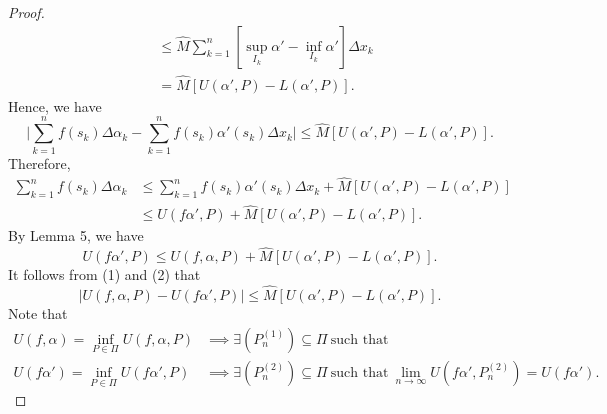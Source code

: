 \begin{proof}
\begin{align*}
    &\leq \hat{M} \sum_{ k=1  }^{ n } [\sup_{{I}_{k}} \alpha' - \inf_{{I}_{k}} \alpha'] \Delta {x}_{k} \tag{lemma 1} \\
    &= \hat{M} [U(\alpha',P) - L(\alpha',P)].
\end{align*}
Hence, we have
\[ \Big| \sum_{ k=1  }^{ n } f({s}_{k}) \Delta {\alpha}_{k } - \sum_{ k=1  }^{ n } f({s}_{k}) \alpha'({s}_{k}) \Delta {x}_{k} \Big| \leq \hat{M} [U(\alpha',P) - L(\alpha', P)]. \]
Therefore, 
\begin{align*}
    \sum_{ k=1  }^{ n } f({s}_{k}) \Delta {\alpha}_{k } &\leq \sum_{ k=1  }^{ n } f({s}_{k}) \alpha'({s}_{k}) \Delta {x}_{k} + \hat{M} [U(\alpha', P) - L(\alpha',P)] \\
                                                        &\leq U(f\alpha', P) + \hat{M} [U(\alpha',P) - L(\alpha',P)]. \tag{1}
\end{align*}
By Lemma 5, we have
\[  U(f \alpha', P) \leq U(f,\alpha, P) + \hat{M} [U(\alpha',P) - L(\alpha',P)]. \tag{3} \]
It follows from (1) and (2) that
\[  | U(f,\alpha,P) - U(f \alpha', P)   |  \leq \hat{M} [U(\alpha',P) - L(\alpha', P )]. \]
Note that 
\begin{align*}
    U(f,\alpha) = \inf_{P \in \Pi} U(f,\alpha,P) &\implies \exists ({P}_{n}^{(1)}) \subseteq  \Pi \ \text{such that} \  \\
    U(f \alpha') = \inf_{P \in \Pi} U(f \alpha', P) &\implies \exists ({P}_{n}^{(2)}) \subseteq \Pi \ \text{such that} \ \lim_{ n \to \infty  }  U(f \alpha', {P}_{n}^{(2)}) = U(f \alpha'). \tag{2}
\end{align*}


\end{proof}
